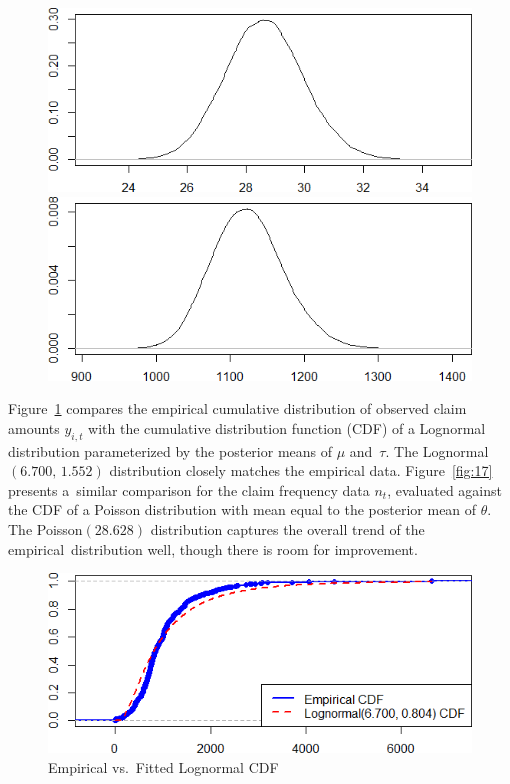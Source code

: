 \documentclass{Class/julia}
\begin{document}
\begin{figure}[!ht]
    \begin{minipage}{0.45\textwidth}
        \centering
        \includegraphics[width=\textwidth]{itamtplcost/density_theta.png}
        \subcaption{\( \theta \)}
    \end{minipage}%
    \hfill
    \begin{minipage}{0.45\textwidth}
        \centering
        \includegraphics[width=\textwidth]{itamtplcost/density_E_y.png}
    \end{minipage}
    
\end{figure}

Figure~\ref{fig:16} compares the empirical cumulative distribution of observed claim amounts \( y_{i,t} \) with the cumulative distribution function (CDF) of a Lognormal distribution parameterized by the posterior means of \( \mu \) and~\( \tau \). The Lognormal\((6.700,\,1.552)\) distribution closely matches the empirical data. Figure~\ref{fig:17} presents a~similar comparison for the claim frequency data \( n_t \), evaluated against the CDF of a Poisson distribution with mean equal to the posterior mean of \( \theta \). The Poisson\((28.628)\) distribution captures the overall trend of the empirical~distribution well, though there is room for improvement.

\begin{figure}[!ht]
    \centering
    \caption{Empirical vs.\ Fitted Lognormal CDF}
    \label{fig:16}
    \includegraphics[width=.5\textwidth]{itamtplcost/empirical_vs_lognormal.png}
\end{figure}
\end{document}
